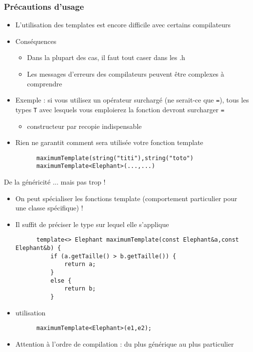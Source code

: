 \begin{frame}[fragile]\frametitle{Précautions d'usage}
  \begin{itemize}
    \item L'utilisation des templates est encore difficile avec certains compilateurs
    \item Conséquences
    \begin{itemize}
      \item Dans la plupart des cas, il faut tout caser dans les .h
      \item Les messages d'erreurs des compilateurs peuvent être complexes à comprendre
    \end{itemize}
    \item Exemple : si vous utilisez un opérateur surchargé (ne serait-ce que \texttt{=}), tous les types \texttt{T} avec lesquels vous emploierez la fonction devront surcharger \texttt{=}
    \begin{itemize}
      \item constructeur par recopie indispensable
    \end{itemize}
    \item Rien ne garantit comment sera utilisée votre fonction template
    \begin{lstlisting}
      maximumTemplate(string("titi"),string("toto")
      maximumTemplate<Elephant>(...,...)
    \end{lstlisting}
  \end{itemize}
\end{frame}

\begin{frame}[fragile]{De la généricité ... mais pas trop !}
  \begin{itemize}
    \item On peut spécialiser les fonctions template (comportement particulier pour une classe spécifique) !
    \item Il suffit de préciser le type sur lequel elle s'applique
    \begin{lstlisting}
      template<> Elephant maximumTemplate(const Elephant&a,const Elephant&b) {
          if (a.getTaille() > b.getTaille()) {
              return a;
          }
          else {
              return b;
          }
    \end{lstlisting}
    \item utilisation
    \begin{lstlisting}
      maximumTemplate<Elephant>(e1,e2);
    \end{lstlisting}
    \item Attention à l'ordre de compilation : du plus générique au plus particulier
  \end{itemize}
\end{frame}


